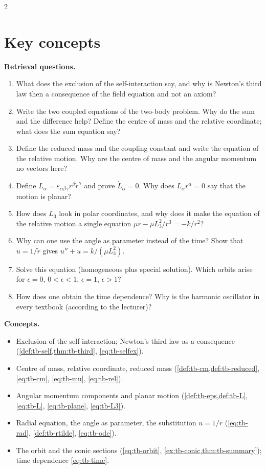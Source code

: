 \begin{paracol}{2}
\section*{Key concepts}
\begin{keyconcepts}
\textbf{Retrieval questions.}
\begin{enumerate}
  \item What does the exclusion of the self-interaction say, and why is Newton's third law then a consequence of the field equation and not an axiom?
  \item Write the two coupled equations of the two-body problem. Why do the sum and the difference help? Define the centre of mass and the relative coordinate; what does the sum equation say?
  \item Define the reduced mass and the coupling constant and write the equation of the relative motion. Why are the centre of mass and the angular momentum no vectors here?
  \item Define $L_\alpha=\varepsilon_{\alpha\beta\gamma}r^\beta\dot r^\gamma$ and prove $\dot L_\alpha=0$. Why does $L_\alpha r^\alpha=0$ say that the motion is planar?
  \item How does $L_3$ look in polar coordinates, and why does it make the equation of the relative motion a single equation $\mu\ddot r-\mu L_3^2/r^3=-k/r^2$?
  \item Why can one use the angle as parameter instead of the time? Show that $u=1/\tilde r$ gives $u''+u=k/(\mu L_3^2)$.
  \item Solve this equation (homogeneous plus special solution). Which orbits arise for $\epsilon=0$, $0<\epsilon<1$, $\epsilon=1$, $\epsilon>1$?
  \item How does one obtain the time dependence? Why is the harmonic oscillator in every textbook (according to the lecturer)?
\end{enumerate}
\textbf{Concepts.}
\begin{itemize}
  \item Exclusion of the self-interaction; Newton's third law as a consequence (\cref{def:tb-self,thm:tb-third}, \eqref{eq:tb-selfex}).
  \item Centre of mass, relative coordinate, reduced mass (\cref{def:tb-cm,def:tb-reduced}, \eqref{eq:tb-cm}, \eqref{eq:tb-mu}, \eqref{eq:tb-rel}).
  \item Angular momentum components and planar motion (\cref{def:tb-eps,def:tb-L}, \eqref{eq:tb-L}, \eqref{eq:tb-plane}, \eqref{eq:tb-L3}).
  \item Radial equation, the angle as parameter, the substitution $u=1/\tilde r$ (\eqref{eq:tb-rad}, \cref{def:tb-rtilde}, \eqref{eq:tb-ode}).
  \item The orbit and the conic sections (\eqref{eq:tb-orbit}, \cref{ex:tb-conic,thm:tb-summary}); time dependence \eqref{eq:tb-time}.
\end{itemize}
\end{keyconcepts}

\flushside
\end{paracol}
